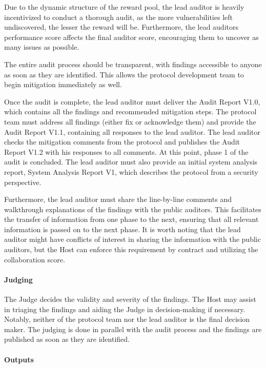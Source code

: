 \documentclass[10pt]{extarticle}
\begin{document}
Due to the dynamic structure of the reward pool, the lead auditor is
heavily incentivized to conduct a thorough audit, as the more
vulnerabilities left undiscovered, the lesser the reward will be.
Furthermore, the lead auditor\textquotesingle s performance score
affects the final auditor score, encouraging them to uncover as many
issues as possible.

The entire audit process should be transparent, with findings accessible
to anyone as soon as they are identified. This allows the protocol
development team to begin mitigation immediately as well.

Once the audit is complete, the lead auditor must deliver the Audit
Report V1.0, which contains all the findings and recommended mitigation
steps. The protocol team must address all findings (either fix or
acknowledge them) and provide the Audit Report V1.1, containing all
responses to the lead auditor. The lead auditor checks the mitigation
comments from the protocol and publishes the Audit Report V1.2 with his
responses to all comments. At this point, phase 1 of the audit is
concluded. The lead auditor must also provide an initial system analysis
report, System Analysis Report V1, which describes the protocol from a
security perspective.

Furthermore, the lead auditor must share the line-by-line comments and
walkthrough explanations of the findings with the public auditors. This
facilitates the transfer of information from one phase to the next,
ensuring that all relevant information is passed on to the next phase.
It is worth noting that the lead auditor might have conflicts of
interest in sharing the information with the public auditors, but the
Host can enforce this requirement by contract and utilizing the
collaboration score.

\paragraph{Judging}\label{judging}

The Judge decides the validity and severity of the findings. The Host
may assist in triaging the findings and aiding the Judge in
decision-making if necessary. Notably, neither of the protocol team nor
the lead auditor is the final decision maker. The judging is done in
parallel with the audit process and the findings are published as soon
as they are identified.

\paragraph{Outputs}\label{outputs}
\end{document}
